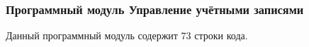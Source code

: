 \subsubsection{Программный модуль \textbf{Управление учётными записями}}

Данный программный модуль содержит 73 строки кода.
